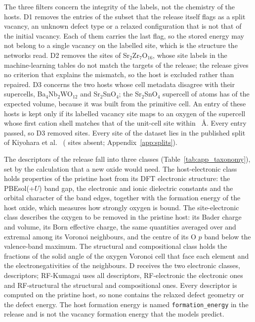 The three filters concern the integrity of the labels, not the chemistry of the hosts. D1 removes the \numFilterCascadeStepsDOneNRemoved{} entries of the subset that the release itself flags as a split vacancy, an unknown defect type or a relaxed configuration that is not that of the initial vacancy. Each of them carries the last flag, so the stored energy may not belong to a single vacancy on the labelled site, which is the structure the networks read. D2 removes the \numFilterCascadeStepsDTwoNRemoved{} sites of Sr$_2$Zr$_7$O$_{16}$, whose site labels in the machine-learning tables do not match the targets of the release; the release gives no criterion that explains the mismatch, so the host is excluded rather than repaired. D3 concerns the two hosts whose cell metadata disagree with their supercells, Ba$_4$Nb$_2$WO$_{12}$ and Sr$_2$SnO$_4$; the Sr$_2$SnO$_4$ supercell of \numStructureAuditAnomalousHostsSrTwoSnOFourNAtomsSc{} atoms has \numStructureAuditAnomalousHostsSrTwoSnOFourVolumeRatio{} of the expected volume, because it was built from the primitive cell. An entry of these hosts is kept only if its labelled vacancy site maps to an oxygen of the supercell whose first cation shell matches that of the unit-cell site within \numFilterCascadeDThreeSrTwoSnOFourSitesOOneToleranceA{}~\AA{}. Every entry passed, so D3 removed \numFilterCascadeStepsDThreeNRemoved{} sites. Every site of the dataset lies in the published split of Kiyohara et al.\ \citep{Kiyohara2025machinelearning} (\numFilterCascadeKiyoharaSplitSitesAbsent{} sites absent; Appendix~\ref{app:splits}).

The descriptors of the release fall into three classes (Table~\ref{tab:app_taxonomy}), set by the calculation that a new oxide would need. The host-electronic class holds properties of the pristine host from its DFT electronic structure: the PBEsol(+$U$) band gap, the electronic and ionic dielectric constants and the orbital character of the band edges, together with the formation energy of the host oxide, which measures how strongly oxygen is bound. The site-electronic class describes the oxygen to be removed in the pristine host: its Bader charge and volume, its Born effective charge, the same quantities averaged over and extremal among its Voronoi neighbours, and the centre of its O $p$ band below the valence-band maximum. The structural and compositional class holds the fractions of the solid angle of the oxygen Voronoi cell that face each element and the electronegativities of the neighbours. D receives the two electronic classes, \numRfElectronicNFeatures{} descriptors; RF-Kumagai uses all \numRfKumagaiNFeatures{} descriptors, RF-electronic the \numRfElectronicNFeatures{} electronic ones and RF-structural the \numRfStructuralNFeatures{} structural and compositional ones. Every descriptor is computed on the pristine host, so none contains the relaxed defect geometry or the defect energy. The host formation energy is named \texttt{formation\_energy} in the release and is not the vacancy formation energy that the models predict.

